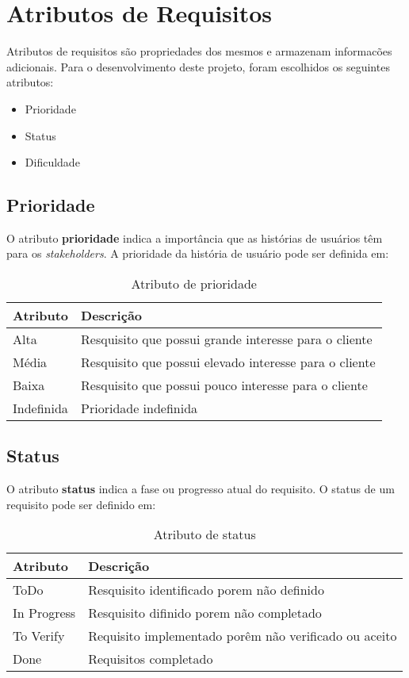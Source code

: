 \section{Atributos de Requisitos}
	Atributos de requisitos são propriedades dos mesmos e armazenam informacões adicionais. Para o desenvolvimento deste projeto, foram escolhidos os seguintes atributos:
	\begin{itemize}
		\item Prioridade
		\item Status
		\item Dificuldade
	\end{itemize}

	\subsection{Prioridade}
	O atributo \textbf{prioridade} indica a importância que as histórias de usuários têm para os \textit{stakeholders}. A prioridade da história de usuário pode ser definida em:

	\begin{table}[htbp]
		\centering
		\caption{Atributo de prioridade}
		\begin{tabular}{|l|l|}
			\hline
			\textbf{Atributo} & \textbf{Descrição} \\ \hline
			Alta & Resquisito que possui grande interesse para o cliente \\ \hline
			Média & Resquisito que possui elevado interesse para o cliente \\ \hline
			Baixa & Resquisito que possui pouco interesse para o cliente \\ \hline
			Indefinida & Prioridade indefinida \\ \hline
		\end{tabular}
	\label{Atributo de prioridade}
	\end{table}


	\subsection{Status}
	O atributo \textbf{status} indica a fase ou progresso atual do requisito. O status de um requisito pode ser definido em:
	\begin{table}[htbp]
		\centering
		\caption{Atributo de status}
		\begin{tabular}{|l|l|}
			\hline
			\textbf{Atributo} & \textbf{Descrição} \\ \hline
			ToDo & Resquisito identificado porem não definido \\ \hline
			In Progress & Resquisito difinido porem não completado \\ \hline
			To Verify & Requisito implementado porêm não verificado ou aceito \\ \hline
			Done & Requisitos completado \\ \hline
		\end{tabular}
	\label{Atributo de status}
	\end{table}


